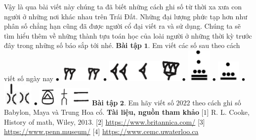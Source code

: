 \begin{multicols}{2}
	\vskip 0.1cm
	Vậy là qua bài viết này chúng ta đã biết những cách ghi số  từ thời xa xưa con người ở những nơi khác nhau trên Trái Đất. Những đại lượng phức tạp hơn như phân số chẳng hạn cũng đã được người cổ đại viết ra và sử dụng. Chúng ta sẽ tìm hiểu thêm về những thành tựu toán học của loài người ở những thời kỳ trước đây trong những số báo sắp tới nhé. 
	\vskip 0.1cm
	\textbf{\color{toancuabi}Bài tập} $\pmb{1.}$
	Em viết các số sau theo cách viết số ngày nay
	\vskip 0.1cm
	$\bullet$ \includegraphics[scale=0.5]{babylon1}
	\vskip 0.1cm
	$\bullet$ \includegraphics[scale=0.42]{babylon2}
	\vskip 0.1cm
	$\bullet$ \includegraphics[scale=0.42]{maya1}
	\vskip 0.1cm
	$\bullet$ \includegraphics[scale=0.42]{maya2}
	\vskip 0.1cm
	$\bullet$ \includegraphics[scale=0.5]{china2}
	\vskip 0.1cm
	$\bullet$ \includegraphics[scale=0.5]{china4}
	\vskip 0.1cm
	\textbf{\color{toancuabi}Bài tập} $\pmb{2.}$ Em hãy viết số $2022$ theo cách ghi số Babylon, Maya và Trung Hoa cổ.
	\vskip 0.1cm
	\textbf{\color{toancuabi}Tài liệu, nguồn tham khảo}
	\vskip 0.1cm
	[$1$] R. L. Cooke, History of math, Wiley, $2013$.
	\vskip 0.1cm
	[$2$] \url{https://www.britannica.com/}
	\vskip 0.1cm
	[$3$] \url{https://www.penn.museum/}
	\vskip 0.1cm
	[$4$] \url{https://www.cemc.uwaterloo.ca}
\end{multicols}
\newpage
\graphicspath{{../toancuabi/pic/}}
\begingroup

